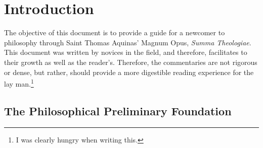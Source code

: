 \documentclass{ucetd}
\author{Aron Aziz, Joseph Samo, Will Whitlow }
\begin{document}
\maketitle

\makededication

\makeepigraph


\tableofcontents
\clearpage
\clearpage

\mainmatter
\chapter{Introduction}

The objective of this document is to provide a guide for a newcomer to philosophy through Saint Thomas Aquinas' Magnum Opus, \textit{Summa Theologiae}. This document was written by novices in the field, and therefore, facilitates to their growth as well as the reader's. Therefore, the commentaries are not rigorous or dense, but rather, should provide a more digestible reading experience for the lay man.\footnote{I was clearly hungry when writing this.}
\section{The Philosophical Preliminary Foundation}
\end{document}
